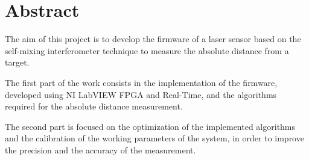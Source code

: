 \newpage
\chapter*{Abstract}


The aim of this project is to develop the firmware of a laser sensor based on the self-mixing interferometer technique to measure the absolute distance from a target.

The first part of the work consists in the implementation of the firmware, developed using NI LabVIEW FPGA and Real-Time, and the algorithms required for the absolute distance measurement.

The second part is focused on the optimization of the implemented algorithms and the calibration of the working parameters of the system, in order to improve the precision and the accuracy of the measurement.